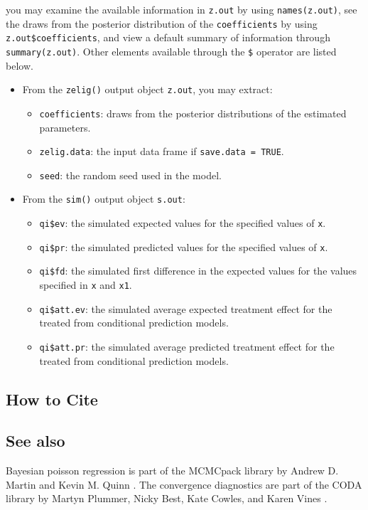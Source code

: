 \noindent you may examine the available information in \texttt{z.out} by
using \texttt{names(z.out)}, see the draws from the posterior distribution of
the \texttt{coefficients} by using \texttt{z.out\$coefficients}, and view a 
default summary of information through \texttt{summary(z.out)}. Other elements
available through the \texttt{\$} operator are listed below.

\begin{itemize}
\item From the \texttt{zelig()} output object \texttt{z.out}, you may extract:

\begin{itemize}
\item \texttt{coefficients}: draws from the posterior distributions
of the estimated parameters.

   \item {\tt zelig.data}: the input data frame if {\tt save.data = TRUE}.  
\item \texttt{seed}: the random seed used in the model.

\end{itemize}

\item From the \texttt{sim()} output object \texttt{s.out}:

\begin{itemize}
\item \texttt{qi\$ev}: the simulated expected values for the specified
values of \texttt{x}.

\item \texttt{qi\$pr}: the simulated predicted values for the specified values
of \texttt{x}.

\item \texttt{qi\$fd}: the simulated first difference in the expected
values for the values specified in \texttt{x} and \texttt{x1}.

\item \texttt{qi\$att.ev}: the simulated average expected treatment effect
for the treated from conditional prediction models.

\item \texttt{qi\$att.pr}: the simulated average predicted treatment effect
for the treated from conditional prediction models.
\end{itemize}
\end{itemize}

\subsection* {How to Cite} 



\subsection*{See also}
Bayesian poisson regression is part of the MCMCpack library by Andrew D. Martin and Kevin M. Quinn \citep{MarQui05}. The convergence diagnostics are part of the CODA library by Martyn Plummer, Nicky Best, Kate Cowles, and Karen Vines \citep{PluBesCowVin05}.
